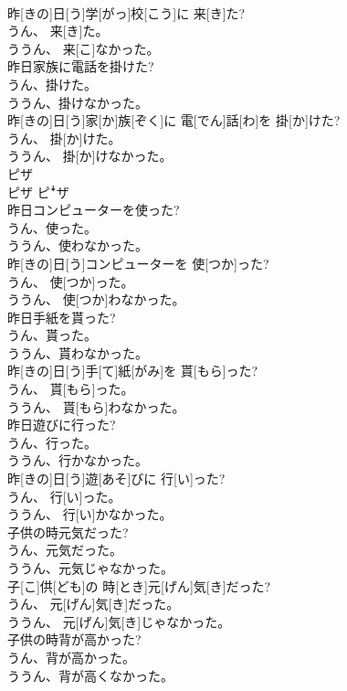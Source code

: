 \documentclass[8pt]{extreport}
\begin{document}
\begin{CJK}{UTF8}{min}
\\	昨[きの]日[う]学[がっ]校[こう]に 来[き]た? 
\\	うん、 来[き]た。 
\\	ううん、 来[こ]なかった。
\\	昨日家族に電話を掛けた? 
\\	うん、掛けた。 
\\	ううん、掛けなかった。	
\\	昨[きの]日[う]家[か]族[ぞく]に 電[でん]話[わ]を 掛[か]けた? 
\\	うん、 掛[か]けた。 
\\	ううん、 掛[か]けなかった。
\\	ピザ	
\\	ピザ	ピꜜザ
\\	昨日コンピューターを使った? 
\\	うん、使った。 
\\	ううん、使わなかった。	
\\	昨[きの]日[う]コンピューターを 使[つか]った? 
\\	うん、 使[つか]った。 
\\	ううん、 使[つか]わなかった。
\\	昨日手紙を貰った? 
\\	うん、貰った。 
\\	ううん、貰わなかった。	
\\	昨[きの]日[う]手[て]紙[がみ]を 貰[もら]った? 
\\	うん、 貰[もら]った。 
\\	ううん、 貰[もら]わなかった。
\\	昨日遊びに行った? 
\\	うん、行った。 
\\	ううん、行かなかった。	
\\	昨[きの]日[う]遊[あそ]びに 行[い]った? 
\\	うん、 行[い]った。 
\\	ううん、 行[い]かなかった。
\\	子供の時元気だった? 
\\	うん、元気だった。 
\\	ううん、元気じゃなかった。	
\\	子[こ]供[ども]の 時[とき]元[げん]気[き]だった? 
\\	うん、 元[げん]気[き]だった。 
\\	ううん、 元[げん]気[き]じゃなかった。
\\	子供の時背が高かった? 
\\	うん、背が高かった。 
\\	ううん、背が高くなかった。	

\end{CJK}
\end{document}
